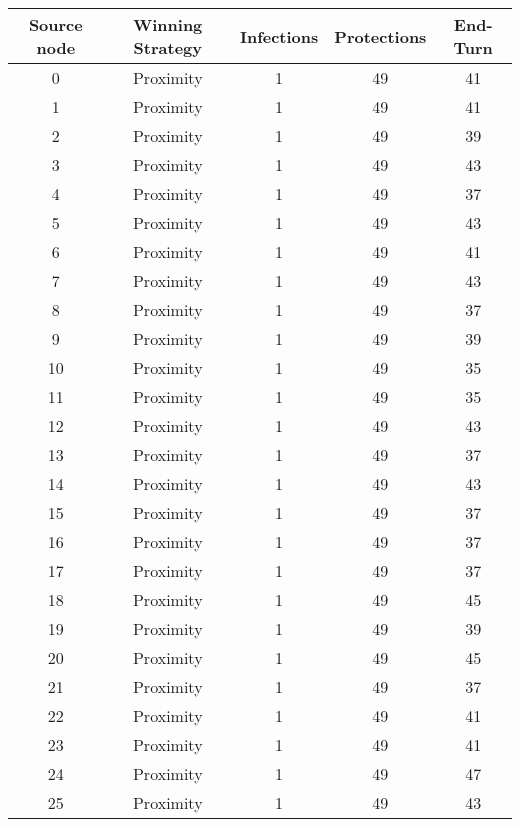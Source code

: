 \documentclass[results.tex]{subfiles}
\begin{document}
\begin{center}
  \begin{tabular}{| c || c | c | c | c |}
    \hline
    {\bfseries Source node} & {\bfseries Winning Strategy} & {\bfseries Infections} & {\bfseries Protections} & {\bfseries End-Turn} \\  %
    \hline\hline
    0 & Proximity & 1 & 49 & 41 \\ 
    \hline
    1 & Proximity & 1 & 49 & 41 \\ 
    \hline
    2 & Proximity & 1 & 49 & 39 \\ 
    \hline
    3 & Proximity & 1 & 49 & 43 \\ 
    \hline
    4 & Proximity & 1 & 49 & 37 \\ 
    \hline
    5 & Proximity & 1 & 49 & 43 \\ 
    \hline
    6 & Proximity & 1 & 49 & 41 \\ 
    \hline
    7 & Proximity & 1 & 49 & 43 \\ 
    \hline
    8 & Proximity & 1 & 49 & 37 \\ 
    \hline
    9 & Proximity & 1 & 49 & 39 \\ 
    \hline
    10 & Proximity & 1 & 49 & 35 \\ 
    \hline
    11 & Proximity & 1 & 49 & 35 \\ 
    \hline
    12 & Proximity & 1 & 49 & 43 \\ 
    \hline
    13 & Proximity & 1 & 49 & 37 \\ 
    \hline
    14 & Proximity & 1 & 49 & 43 \\ 
    \hline
    15 & Proximity & 1 & 49 & 37 \\ 
    \hline
    16 & Proximity & 1 & 49 & 37 \\ 
    \hline
    17 & Proximity & 1 & 49 & 37 \\ 
    \hline
    18 & Proximity & 1 & 49 & 45 \\ 
    \hline
    19 & Proximity & 1 & 49 & 39 \\ 
    \hline
    20 & Proximity & 1 & 49 & 45 \\ 
    \hline
    21 & Proximity & 1 & 49 & 37 \\ 
    \hline
    22 & Proximity & 1 & 49 & 41 \\ 
    \hline
    23 & Proximity & 1 & 49 & 41 \\ 
    \hline
    24 & Proximity & 1 & 49 & 47 \\ 
    \hline
    25 & Proximity & 1 & 49 & 43 \\ 

\end{tabular}
\end{center}
\end{document}
